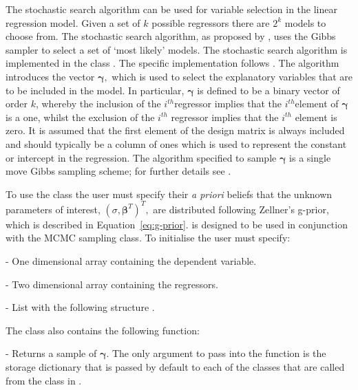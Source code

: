 \documentclass[article]{jss}
\begin{document}
The stochastic search algorithm can be used for variable selection in
the linear regression model. Given a set of $k$ possible regressors
there are $2^{k}$ models to choose from. The stochastic search
algorithm, as proposed by \citet{GeorgeMcCulloch1993}, uses the Gibbs
sampler to select a set of `most likely' models. The stochastic search
algorithm is implemented in the class . The
specific implementation follows \citet{MarinRobert2007}. The algorithm
introduces the vector $\bm{\gamma},$ which is used to select the
explanatory variables that are to be included in the model. In
particular, $\bm{\gamma}$ is defined to be a binary vector of order
$k$, whereby the inclusion of the $i^{th}$regressor implies that the
$i^{th}$element of $\bm{\gamma}$ is a one, whilst the exclusion of the
$i^{th}$ regressor implies that the $i^{th}$ element is zero.  It is
assumed that the first element of the design matrix is always included
and should typically be a column of ones which is used to represent
the constant or intercept in the regression. The algorithm specified
to sample $\bm{\gamma}$ is a single move Gibbs sampling scheme; for
further details see \citet{MarinRobert2007}.

To use the class the user must specify their
\emph{a priori} beliefs that the unknown parameters of interest,
$(\sigma,\bm{\beta}^{T})^{T},$ are distributed following Zellner's
g-prior, which is described in Equation~\ref{eq:g-prior}.
is designed to be used in conjunction with the
MCMC sampling class. To initialise  the user
must specify:
\begin{description}
\item {} - One dimensional  array containing the
  dependent variable.
\item {} - Two dimensional  array containing the
  regressors.
\item {} - List with the following structure
  \code{{[}betaubar, g{]}}.
\end{description}
The class  also contains the following
function:
\begin{description}
\item {} - Returns a sample of $\bm{\gamma}.$
  The only argument to pass into the function  is
  the storage dictionary that is passed by default to each of the
  classes that are called from the class in .
\end{description}
\end{document}
